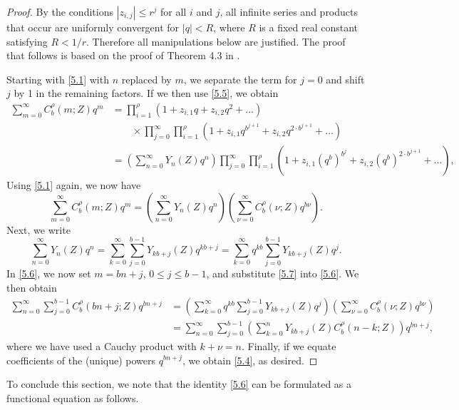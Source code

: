 \documentclass{amsart}
\theoremstyle{plain}
\numberwithin{equation}{section}
\begin{document}
\begin{proof}
By the conditions $|z_{i,j}|\leq r^j$ for all $i$ and $j$, all infinite series 
and products that occur are uniformly convergent for $|q| < R$, where $R$ is 
a fixed real constant satisfying $R<1/r$. Therefore all manipulations below 
are justified. The proof that follows is based on the proof of Theorem 4.3 in 
\cite{DE10}.

Starting with \eqref{5.1} with $n$ replaced by $m$, we separate the term for 
$j=0$ and shift $j$ by 1 in the remaining factors. If we then use \eqref{5.5}, 
we obtain
\begin{align*}
\sum_{m=0}^\infty C_b^\rho(m;Z)q^m 
&=\prod_{i=1}^\rho
\left(1+z_{i,1}q+z_{i,2}q^2+\dots\right)\\
&\qquad \times\prod_{j=0}^\infty\prod_{i=1}^\rho
\left(1+z_{i,1}q^{b^{j+1}}+z_{i,2}q^{2\cdot b^{j+1}}+\dots\right)\\
&=\left(\sum_{n=0}^\infty Y_n(Z)q^n\right)
\prod_{j=0}^\infty\prod_{i=1}^\rho\left(1+z_{i,1}\left(q^b\right)^{b^j}
+z_{i,2}\left(q^b\right)^{2\cdot b^{j+1}}+\dots\right),
\end{align*}
Using \eqref{5.1} again, we now have
\begin{equation}\label{5.6}
\sum_{m=0}^\infty C_b^\rho(m;Z)q^m
=\left(\sum_{n=0}^\infty Y_n(Z)q^n\right)
\left(\sum_{\nu=0}^\infty C_b^\rho(\nu;Z)q^{b\nu}\right).
\end{equation}
Next, we write
\begin{equation}\label{5.7}
\sum_{n=0}^\infty Y_n(Z)q^n
=\sum_{k=0}^\infty\sum_{j=0}^{b-1}Y_{kb+j}(Z)q^{kb+j}
=\sum_{k=0}^\infty q^{kb}\sum_{j=0}^{b-1}Y_{kb+j}(Z)q^j.
\end{equation}
In \eqref{5.6}, we now set $m=bn+j$, $0\leq j\leq b-1$, and substitute 
\eqref{5.7} into \eqref{5.6}. We then obtain
\begin{align}
\sum_{n=0}^\infty\sum_{j=0}^{b-1}C_b^\rho(bn+j;Z)q^{bn+j}
&=\left(\sum_{k=0}^\infty q^{kb}\sum_{j=0}^{b-1}Y_{kb+j}(Z)q^j\right)
\left(\sum_{\nu=0}^\infty C_b^\rho(\nu;Z)q^{b\nu}\right)\label{5.8} \\
&=\sum_{n=0}^\infty\sum_{j=0}^{b-1}
\left(\sum_{k=0}^n Y_{kb+j}(Z)C_b^\rho(n-k;Z)\right)q^{bn+j},\nonumber
\end{align}
where we have used a Cauchy product with $k+\nu=n$. Finally, if we equate 
coefficients of the (unique) powers $q^{bn+j}$, we obtain \eqref{5.4}, as
desired.
\end{proof}

To conclude this section, we note that the identity \eqref{5.6} can be 
formulated as a functional equation as follows.
\end{document}
